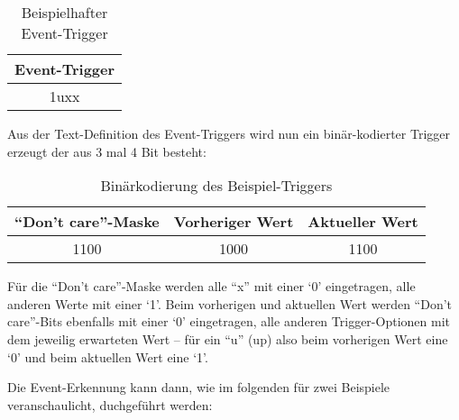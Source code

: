 {\begin{table}[H]
\centering
\begin{tabular}{|c|}
\hline
\rowcolor[HTML]{C0C0C0} 
Event-Trigger \\ \hline
1uxx          \\ \hline
\end{tabular}
\caption{Beispielhafter Event-Trigger}
\label{my-label}
\end{table}


Aus der Text-Definition des Event-Triggers wird nun ein binär-kodierter Trigger erzeugt der aus 3 mal 4 Bit besteht:  
\begin{table}[H]
\centering
\begin{tabular}{|l|l|l|}
\hline
\rowcolor[HTML]{C0C0C0} 
``Don't care''-Maske         & Vorheriger Wert           & Aktueller Wert            \\ \hline
\multicolumn{1}{|c|}{1100} & \multicolumn{1}{c|}{1000} & \multicolumn{1}{c|}{1100} \\ \hline
\end{tabular}
\caption{Binärkodierung des Beispiel-Triggers}
\label{my-label}
\end{table}
 
Für die ``Don't care''-Maske werden alle ``x'' mit einer `0' eingetragen, alle anderen Werte mit einer `1'. Beim vorherigen und aktuellen Wert werden ``Don't care''-Bits ebenfalls mit einer `0' eingetragen, alle anderen Trigger-Optionen mit dem jeweilig erwarteten Wert -- für ein ``u'' (up) also beim vorherigen Wert eine `0' und beim aktuellen Wert eine `1'.

Die Event-Erkennung kann dann, wie im folgenden für zwei Beispiele veranschaulicht, duchgeführt werden:

}
